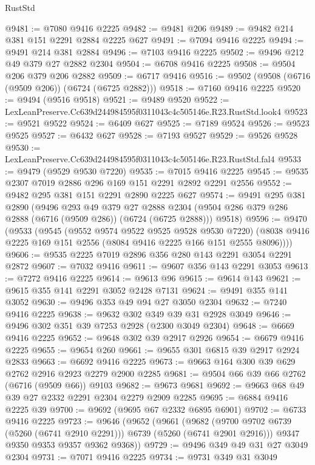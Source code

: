 \begin{lexlean}{RustStd}
\begin{coremodule}
@9481 := @7080 @9416 @2225
@9482 := @9481 @206
@9489 := @9482 @214 @381 @151 @2291 @2884 @2225 @627
@9491 := @7094 @9416 @2225
@9494 := @9491 @214 @381 @2884
@9496 := @7103 @9416 @2225
@9502 := @9496 @212 @49 @379 @27 @2882 @2304
@9504 := @6708 @9416 @2225
@9508 := @9504 @206 @379 @206 @2882
@9509 := @6717 @9416
@9516 := @9502 (@9508 (@6716 (@9509 @206)) (@6724 (@6725 @2882)))
@9518 := @7160 @9416 @2225
@9520 := @9494 (@9516 @9518)
@9521 := @9489 @9520
@9522 := LexLeanPreserve.Cc639d244984595f0311043c4c505146e.R23.RustStd.look4
@9523 := @9521 @9522
@9524 := @6409 @627
@9525 := @7189 @9524
@9526 := @9523 @9525
@9527 := @6432 @627
@9528 := @7193 @9527
@9529 := @9526 @9528
@9530 := LexLeanPreserve.Cc639d244984595f0311043c4c505146e.R23.RustStd.fal4
@9533 := @9479 (@9529 @9530 @7220)
@9535 := @7015 @9416 @2225
@9545 := @9535 @2307 @7019 @2886 @296 @169 @151 @2291 @2892 @2291 @2556
@9552 := @9482 @295 @381 @151 @2291 @2890 @2225 @627
@9574 := @9491
    @295
    @381
    @2890
    (@9496
      @293
      @49
      @379
      @27
      @2888
      @2304
      (@9504 @286 @379 @286 @2888 (@6716 (@9509 @286)) (@6724 (@6725 @2888)))
      @9518)
@9596 := @9470
    (@9533
      (@9545
        (@9552 @9574 @9522 @9525 @9528 @9530 @7220)
        (@8038 @9416 @2225 @169 @151 @2556 (@8084 @9416 @2225 @166 @151 @2555 @8096))))
@9606 := @9535 @2225 @7019 @2896 @356 @280 @143 @2291 @3054 @2291 @2872
@9607 := @7032 @9416
@9611 := @9607 @356 @143 @2291 @3053
@9613 := @7272 @9416 @2225
@9614 := @9613 @96
@9615 := @9614 @143
@9621 := @9615 @355 @141 @2291 @3052 @2428 @7131
@9624 := @9491 @355 @141 @3052
@9630 := @9496 @353 @49 @94 @27 @3050 @2304
@9632 := @7240 @9416 @2225
@9638 := @9632 @302 @349 @39 @31 @2928 @3049
@9646 := @9496 @302 @351 @39 @7253 @2928 (@2300 @3049 @2304)
@9648 := @6669 @9416 @2225
@9652 := @9648 @302 @39 @2917 @2926
@9654 := @6679 @9416 @2225
@9655 := @9654 @260
@9661 := @9655 @301 @6815 @39 @2917 @2924 @2833
@9663 := @6692 @9416 @2225
@9673 := @9663 @164 @300 @39 @629 @2762 @2916 @2923 @2279 @2900 @2285
@9681 := @9504 @66 @39 @66 @2762 (@6716 (@9509 @66)) @9103
@9682 := @9673 @9681
@9692 := @9663 @68 @49 @39 @27 @2332 @2291 @2304 @2279 @2909 @2285
@9695 := @6884 @9416 @2225 @39
@9700 := @9692 (@9695 @67 @2332 @6895 @6901)
@9702 := @6733 @9416 @2225
@9723 := @9646
    (@9652
      (@9661
        (@9682 (@9700 @9702 @6739 (@5260 (@6741 @2910 @2291))) @6739 (@5260 (@6741 @2901 @2916)))
        @9347
        @9350
        @9353
        @9357
        @9362
        @9368))
@9729 := @9496 @349 @49 @31 @27 @3049 @2304
@9731 := @7071 @9416 @2225
@9734 := @9731 @349 @31 @3049

\end{coremodule}
\end{lexlean}

